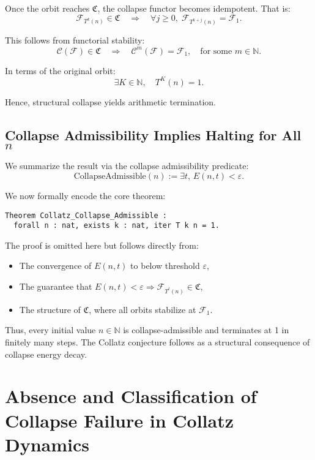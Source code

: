 \documentclass[11pt]{article}
\begin{document}
Once the orbit reaches \( \mathfrak{C} \), the collapse functor becomes idempotent. That is:
\[
\mathcal{F}_{T^k(n)} \in \mathfrak{C} \quad \Rightarrow \quad \forall j \geq 0,\; \mathcal{F}_{T^{k+j}(n)} = \mathcal{F}_1.
\]

This follows from functorial stability:
\[
\mathcal{C}(\mathcal{F}) \in \mathfrak{C} \quad \Rightarrow \quad \mathcal{C}^m(\mathcal{F}) = \mathcal{F}_1, \quad \text{for some } m \in \mathbb{N}.
\]

In terms of the original orbit:
\[
\exists K \in \mathbb{N}, \quad T^K(n) = 1.
\]

Hence, structural collapse yields arithmetic termination.

\subsection{Collapse Admissibility Implies Halting for All \texorpdfstring{\( n \)}{n}}

We summarize the result via the collapse admissibility predicate:
\[
\text{CollapseAdmissible}(n) := \exists t,\, E(n,t) < \varepsilon.
\]

We now formally encode the core theorem:

\begin{lstlisting}[language=Coq]
Theorem Collatz_Collapse_Admissible :
  forall n : nat, exists k : nat, iter T k n = 1.
\end{lstlisting}

The proof is omitted here but follows directly from:
\begin{itemize}
  \item The convergence of \( E(n,t) \) to below threshold \( \varepsilon \),
  \item The guarantee that \( E(n,t) < \varepsilon \Rightarrow \mathcal{F}_{T^t(n)} \in \mathfrak{C} \),
  \item The structure of \( \mathfrak{C} \), where all orbits stabilize at \( \mathcal{F}_1 \).
\end{itemize}

Thus, every initial value \( n \in \mathbb{N} \) is collapse-admissible and terminates at 1 in finitely many steps. The Collatz conjecture follows as a structural consequence of collapse energy decay.



\section{Absence and Classification of Collapse Failure in Collatz Dynamics}
\end{document}
